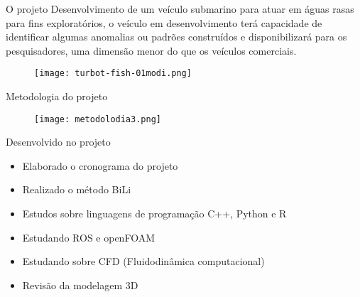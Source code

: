 
\begin{frame}[c]{O projeto}
    Desenvolvimento de um veículo submarino para atuar em águas rasas para fins exploratórios,
    o veículo em desenvolvimento terá capacidade de identificar algumas anomalias ou padrões construídos
    e disponibilizará para os pesquisadores, uma dimensão menor do que os veículos comerciais.
    \begin{figure}
        \texttt{[image: turbot-fish-01modi.png]}
    \end{figure}
    
\end{frame}
\begin{frame}[c]{Metodologia do projeto }
        \begin{figure}
        \texttt{[image: metodolodia3.png]}
    \end{figure}
\end{frame}
\begin{frame}[t]{Desenvolvido no projeto}
    \begin{itemize}
        \item Elaborado o cronograma do projeto
        \item Realizado o método BiLi
        \item Estudos sobre linguagens de programação C++, Python e R
        \item Estudando ROS e openFOAM
        \item Estudando sobre CFD (Fluidodinâmica computacional)
        \item Revisão da modelagem 3D 
    \end{itemize}    
\end{frame}
